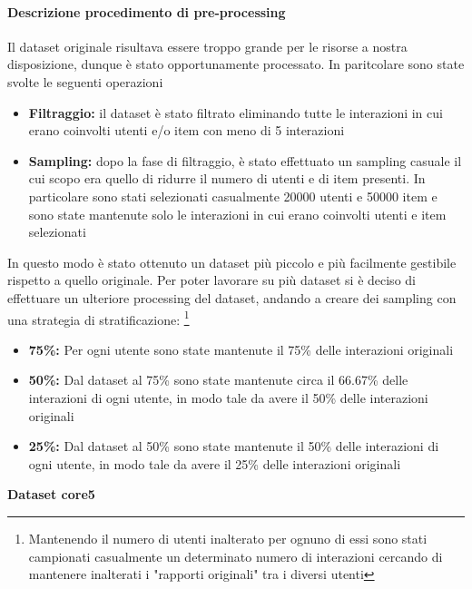 \paragraph{Descrizione procedimento di pre-processing}


\noindent Il dataset originale risultava essere troppo grande per le risorse a nostra disposizione, dunque è stato opportunamente processato. In paritcolare sono state svolte le seguenti operazioni
\begin{itemize}
    \item \textbf{Filtraggio:} il dataset è stato filtrato eliminando tutte le interazioni in cui erano coinvolti utenti e/o item con meno di 5 interazioni
    \item \textbf{Sampling:} dopo la fase di filtraggio, è stato effettuato un sampling casuale il cui scopo era quello di ridurre il numero di utenti e di item presenti. In particolare sono stati selezionati casualmente 20000 utenti e 50000 item e sono state mantenute solo le interazioni in cui erano coinvolti utenti e item selezionati
\end{itemize}

\noindent In questo modo è stato ottenuto un dataset più piccolo e più facilmente gestibile rispetto a quello originale.
Per poter lavorare su più dataset si è deciso di effettuare un ulteriore processing del dataset, andando a creare dei sampling con una strategia di stratificazione: \footnote{{{Mantenendo il numero di utenti inalterato per ognuno di essi sono stati campionati casualmente un determinato numero di interazioni cercando di mantenere inalterati i "rapporti originali" tra i diversi utenti}}}{}
\begin{itemize}
    \item \textbf{75\%:} Per ogni utente sono state mantenute il 75\% delle interazioni originali
    \item \textbf{50\%:} Dal dataset al 75\% sono state mantenute circa il 66.67\% delle interazioni di ogni utente, in modo tale da avere il 50\% delle interazioni originali
    \item \textbf{25\%:} Dal dataset al 50\% sono state mantenute il 50\% delle interazioni di ogni utente, in modo tale da avere il 25\% delle interazioni originali
\end{itemize}

\noindent\textbf{Dataset core5}

